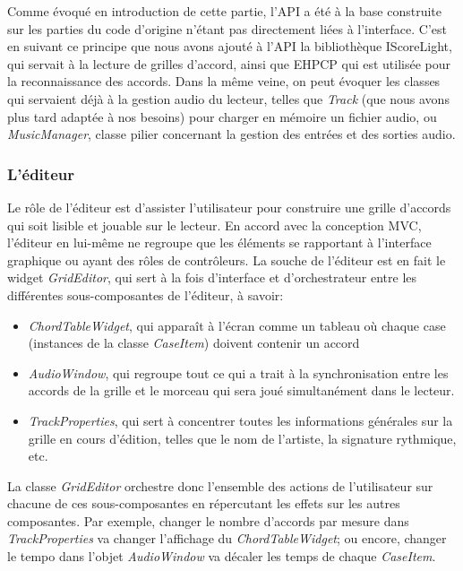 Comme évoqué en introduction de cette partie, l'\ac{API} a été à la base construite sur les parties du code d'origine n'étant pas directement liées à l'interface. C'est en suivant ce principe que nous avons ajouté à l'\ac{API} la bibliothèque IScoreLight, qui servait à la lecture de grilles d'accord, ainsi que EHPCP qui est utilisée pour la reconnaissance des accords. Dans la même veine, on peut évoquer les classes qui servaient déjà à la gestion audio du lecteur, telles que \textit{Track} (que nous avons plus tard adaptée à nos besoins) pour charger en mémoire un fichier audio, ou \textit{MusicManager}, classe pilier concernant la gestion des entrées et des sorties audio.

\subsubsection{L'éditeur}

Le rôle de l'éditeur est d'assister l'utilisateur pour construire une grille d'accords qui soit lisible et jouable sur le lecteur. En accord avec la conception \ac{MVC}, l'éditeur en lui-même ne regroupe que les éléments se rapportant à l'interface graphique ou ayant des rôles de contrôleurs. La souche de l'éditeur est en fait le widget \textit{GridEditor}, qui sert à la fois d'interface et d'orchestrateur entre les différentes sous-composantes de l'éditeur, à savoir:
\begin{itemize}
 \item \textit{ChordTableWidget}, qui apparaît à l'écran comme un tableau où chaque case (instances de la classe \textit{CaseItem}) doivent contenir un accord
 \item \textit{AudioWindow}, qui regroupe tout ce qui a trait à la synchronisation entre les accords de la grille et le morceau qui sera joué simultanément dans le lecteur.
 \item \textit{TrackProperties}, qui sert à concentrer toutes les informations générales sur la grille en cours d'édition, telles que le nom de l'artiste, la signature rythmique, etc.
\end{itemize}

La classe \textit{GridEditor} orchestre donc l'ensemble des actions de l'utilisateur sur chacune de ces sous-composantes en répercutant les effets sur les autres composantes. Par exemple, changer le nombre d'accords par mesure dans \textit{TrackProperties} va changer l'affichage du \textit{ChordTableWidget}; ou encore, changer le tempo dans l'objet \textit{AudioWindow} va décaler les temps de chaque \textit{CaseItem}.


